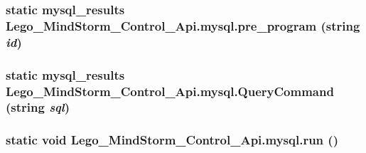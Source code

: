 \hypertarget{class_lego___mind_storm___control___api_1_1mysql_64de1afc554dfa7761e51309b9ebffd1}{
\subsubsection[{pre\_\-program}]{\setlength{\rightskip}{0pt plus 5cm}static {\bf mysql\_\-results} Lego\_\-MindStorm\_\-Control\_\-Api.mysql.pre\_\-program (string {\em id})}}
\label{class_lego___mind_storm___control___api_1_1mysql_64de1afc554dfa7761e51309b9ebffd1}


\hypertarget{class_lego___mind_storm___control___api_1_1mysql_71ccc07db776e71d07efa3e82a0da3b1}{
\subsubsection[{QueryCommand}]{\setlength{\rightskip}{0pt plus 5cm}static {\bf mysql\_\-results} Lego\_\-MindStorm\_\-Control\_\-Api.mysql.QueryCommand (string {\em sql})}}
\label{class_lego___mind_storm___control___api_1_1mysql_71ccc07db776e71d07efa3e82a0da3b1}


\hypertarget{class_lego___mind_storm___control___api_1_1mysql_dde0f51507e171c68bbef9f07ed4cef3}{
\subsubsection[{run}]{\setlength{\rightskip}{0pt plus 5cm}static void Lego\_\-MindStorm\_\-Control\_\-Api.mysql.run ()}}
\label{class_lego___mind_storm___control___api_1_1mysql_dde0f51507e171c68bbef9f07ed4cef3}




